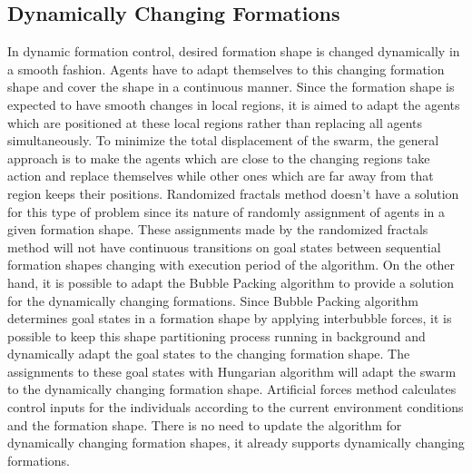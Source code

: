 \subsection{Dynamically Changing Formations} \label{dynamical_ref}
In dynamic formation control, desired formation shape is changed dynamically in a smooth fashion. Agents have to adapt themselves to this changing formation shape and cover the shape in a continuous manner. Since the formation shape is expected to have smooth changes in local regions, it is aimed to adapt the agents which are positioned at these local regions rather than replacing all agents simultaneously. To minimize the total displacement of the swarm, the general approach is to make the agents which are close to the changing regions take action and replace themselves while other ones which are far away from that region keeps their positions. Randomized fractals method doesn't have a solution for this type of problem since its nature of randomly assignment of agents in a given formation shape. These assignments made by the randomized fractals method will not have continuous transitions on goal states between sequential formation shapes changing with execution period of the algorithm. On the other hand, it is possible to adapt the Bubble Packing algorithm to provide a solution for the dynamically changing formations. Since Bubble Packing algorithm determines goal states in a formation shape by applying interbubble forces, it is possible to keep this shape partitioning process running in background and dynamically adapt the goal states to the changing formation shape. The assignments to these goal states with Hungarian algorithm will adapt the swarm to the dynamically changing formation shape. Artificial forces method calculates control inputs for the individuals according to the current environment conditions and the formation shape. There is no need to update the algorithm for dynamically changing formation shapes, it already supports dynamically changing formations. 
		 
